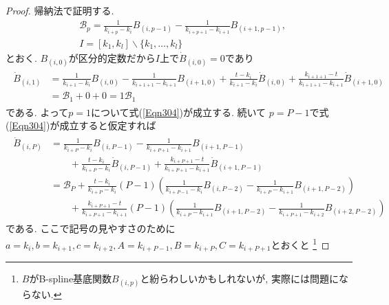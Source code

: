 \documentclass{jsarticle}
\newcommand\Pare[1]{\left(#1\right)}
\theoremstyle{definition}%
\begin{document}
\begin{proof}
	帰納法で証明する.
	\begin{align}
		&\mathcal{B}_p=\frac{1}{k_{i+p}-k_{i}}B_{(i,p-1)}-\frac{1}{k_{i+p+1}-k_{i+1}}B_{(i+1,p-1)}, \\
		&I=[k_1, k_l]\backslash \{k_1,\dots,k_l\}
	\end{align}
	とおく.
	$B_{(i,0)}$が区分的定数だから$I$上で$\dot{B}_{(i,0)}=0$であり
	\begin{align}
		\begin{aligned}
			\dot{B}_{(i,1)}&=
			\frac{1}{k_{i+1}-k_{i}}B_{(i,0)}-\frac{1}{k_{i+1+1}-k_{i+1}}B_{(i+1,0)}
			+\frac{t-k_{i}}{k_{i+1}-k_{i}}\dot{B}_{(i,0)}+\frac{k_{i+1+1}-t}{k_{i+1+1}-k_{i+1}}\dot{B}_{(i+1,0)} \\
			&=\mathcal{B}_1+0+0
			=1\mathcal{B}_1
		\end{aligned}
	\end{align}
	である.
	よって$p=1$について式(\ref{Eqn304})が成立する.
	続いて
	$p=P-1$で式(\ref{Eqn304})が成立すると仮定すれば
	\begin{align}
		\begin{aligned}
			\dot{B}_{(i,P)}&=
			\frac{1}{k_{i+P}-k_{i}}B_{(i,P-1)}-\frac{1}{k_{i+P+1}-k_{i+1}}B_{(i+1,P-1)} \\
			&\qquad+\frac{t-k_{i}}{k_{i+P}-k_{i}}\dot{B}_{(i,P-1)}+\frac{k_{i+P+1}-t}{k_{i+P+1}-k_{i+1}}\dot{B}_{(i+1,P-1)} \\
			&=\mathcal{B}_P+\frac{t-k_{i}}{k_{i+P}-k_{i}}(P-1)\Pare{\frac{1}{k_{i+P-1}-k_{i}}B_{(i,P-2)}-\frac{1}{k_{i+P}-k_{i+1}}B_{(i+1,P-2)}} \\
			&\qquad+\frac{k_{i+P+1}-t}{k_{i+P+1}-k_{i+1}}(P-1)\Pare{\frac{1}{k_{i+P}-k_{i+1}}B_{(i+1,P-2)}-\frac{1}{k_{i+P+1}-k_{i+2}}B_{(i+2,P-2)}}
		\end{aligned}
	\end{align}
	である.
	ここで記号の見やすさのために$a=k_{i}, b=k_{i+1}, c=k_{i+2}, A=k_{i+P-1}, B=k_{i+P}, C=k_{i+P+1}$とおくと
	\footnote{$B$がB-spline基底関数$B_{(i,p)}$と紛らわしいかもしれないが, 実際には問題にならない.}


\end{proof}
\end{document}
